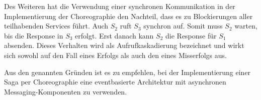 Des Weiteren hat die Verwendung einer synchronen Kommunikation in der Implementierung der Choreographie den Nachteil, dass es zu Blockierungen aller teilhabenden Services führt. Auch $S_2$ ruft $S_3$ synchron auf. Somit muss $S_2$ warten, bis die Response in $S_3$ erfolgt. Erst danach kann $S_2$ die Response für $S_1$ absenden. Dieses Verhalten wird als Aufrufkaskadierung bezeichnet und wirkt sich sowohl auf den Fall eines Erfolgs als auch den eines Misserfolgs aus. 

Aus den genannten Gründen ist es zu empfehlen, bei der Implementierung einer Saga per Choreographie eine eventbasierte Architektur mit asynchronen Messaging-Komponenten zu verwenden.
